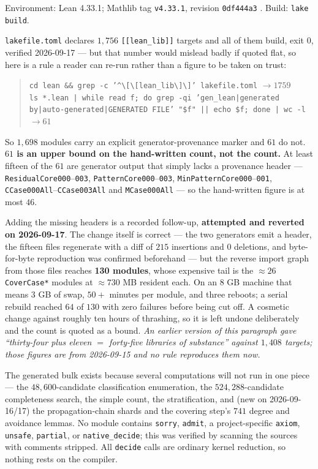 \documentclass[11pt,a4paper]{article}
\theoremstyle{plain}
\theoremstyle{definition}
\theoremstyle{remark}
\begin{document}
Environment: Lean 4.33.1; Mathlib tag \texttt{v4.33.1}, revision
\texttt{0df444a3} \cite{MathlibCommunity}. Build: \texttt{lake build}.

\texttt{lakefile.toml} declares $1{,}756$ \texttt{[[lean\_lib]]} targets and all
of them build, exit $0$, verified 2026-09-17 --- but that number would mislead
badly if quoted flat, so here is a rule a reader can re-run rather than a figure
to be taken on trust:
\begin{quote}\footnotesize
\texttt{cd lean \&\& grep -c '\^{}\textbackslash[\textbackslash[lean\_lib\textbackslash]\textbackslash]' lakefile.toml} $\to 1759$\\
\texttt{ls *.lean | while read f; do grep -qi 'gen\_lean|generated by|auto-generated|GENERATED FILE' "\$f" || echo \$f; done | wc -l} $\to 61$
\end{quote}
So $1{,}698$ modules carry an explicit generator-provenance marker and $61$ do
not. \textbf{$61$ is an upper bound on the hand-written count, not the count.}
At least fifteen of the $61$ are generator output that simply lacks a provenance
header --- \texttt{ResidualCore000}--\texttt{003},
\texttt{PatternCore000}--\texttt{003}, \texttt{MinPatternCore000}--\texttt{001},
\texttt{CCase000All}--\texttt{CCase003All} and \texttt{MCase000All} --- so the
hand-written figure is at most $46$.

Adding the missing headers is a recorded follow-up, \textbf{attempted and
reverted on 2026-09-17}. The change itself is correct --- the two generators
emit a header, the fifteen files regenerate with a diff of $215$ insertions and
$0$ deletions, and byte-for-byte reproduction was confirmed beforehand --- but
the reverse import graph from those files reaches \textbf{130 modules}, whose
expensive tail is the ${\approx}26$ \texttt{CoverCase*} modules at
${\approx}730$ MB resident each. On an 8 GB machine that means $3$ GB of swap,
$50{+}$ minutes per module, and three reboots; a serial rebuild reached $64$ of
$130$ with zero failures before being cut off. A cosmetic change against roughly
ten hours of thrashing, so it is left undone deliberately and the count is
quoted as a bound. \emph{An earlier version of this paragraph gave ``thirty-four
plus eleven $=$ forty-five libraries of substance'' against $1{,}408$ targets;
those figures are from 2026-09-15 and no rule reproduces them now.}

The generated bulk exists because several computations will not run in one piece
--- the $48{,}600$-candidate classification enumeration, the $524{,}288$-candidate
completeness search, the simple count, the stratification, and (new on
2026-09-16/17) the propagation-chain shards and the covering step's $741$
degree and avoidance lemmas. No module contains
\texttt{sorry}, \texttt{admit}, a project-specific \texttt{axiom},
\texttt{unsafe}, \texttt{partial}, or \texttt{native\_decide}; this was verified
by scanning the sources with comments stripped. All \texttt{decide} calls are
ordinary kernel reduction, so nothing rests on the compiler.
\end{document}
